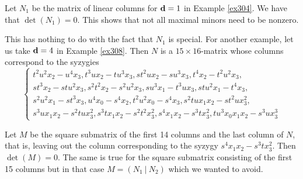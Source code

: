 \documentclass[fleqn,reqno]{amsart}
\begin{document}
\begin{example}[$\mt{ex309}$]
\label{ex309}
Let $N_1$ be the matrix of linear columns for $\mathbf d=1$ in Example \ref{ex304}.
We have that $\det(N_1)=0$. This shows that not all maximal minors need to be nonzero.

This has nothing to do with the fact that $N_1$ is special.
For another example, let us take $\mathbf d=4$ in Example \ref{ex308}.
Then $N$ is a $15\times16$-matrix whose columns correspond to the syzygies
\[
	\begin{cases}
	t^{2} u^{2} {x}_{2}-u^{4} {x}_{3},
	t^{3} u {x}_{2}-t u^{3} {x}_{3},
	s t^{2} u{x}_{2}-s u^{3} {x}_{3},
	t^{4} {x}_{2}-t^{2} u^{2} {x}_{3},\\
	s t^{3} {x}_{2}-s tu^{2} {x}_{3},
	s^{2} t^{2} {x}_{2}-s^{2} u^{2} {x}_{3},
	s u^{3} {x}_{1}-t^{3} u{x}_{3},
	s t u^{2} {x}_{1}-t^{4} {x}_{3},\\
	s^{2} u^{2} {x}_{1}-s t^{3}{x}_{3},
	u^{4} {x}_{0}-s^{4} {x}_{2},
	t^{2} u^{2} {x}_{0}-s^{4} {x}_{3},
	s^{2} t u {x}_{1} {x}_{2}-s t^{2} u {x}_{3}^{2},\\
	s^{3} u {x}_{1} {x}_{2}-s^{2} t u
      {x}_{3}^{2},s^{3} t {x}_{1} {x}_{2}-s^{2} t^{2} {x}_{3}^{2},
	  s^{4} {x}_{1}{x}_{2}-s^{3} t {x}_{3}^{2},
	  t u^{3} {x}_{0} {x}_{1} {x}_{2}-s^{3} u{x}_{3}^{3}
	\end{cases}
\]

Let $M$ be the square submatrix of the first 14 columns and the last column of $N$,
that is,
leaving out the column corresponding to the syzygy $s^{4} {x}_{1}{x}_{2}-s^{3} t {x}_{3}^{2}$.
Then $\det(M)=0$.
The same is true for the square submatrix consisting of the first 15 columns
but in that case $M=(N_1~|~N_2)$ which we wanted to avoid.
\end{example}
\end{document}
